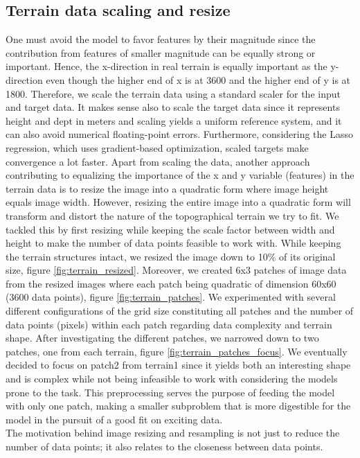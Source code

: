 \documentclass[11pt, a4paper]{article}
\begin{document}
\subsection*{Terrain data scaling and resize}
One must avoid the model to favor features by their magnitude since the contribution from features of smaller magnitude can be equally strong or important. 
Hence, the x-direction in real terrain is equally important as the y-direction even though the higher end of x is at 3600 and the higher end of y is at 1800. 
Therefore, we scale the terrain data using a standard scaler for the input and target data. It makes sense also to scale the target data since it represents 
height and dept in meters and scaling yields a uniform reference system, and it can also avoid numerical floating-point errors. Furthermore, considering the Lasso regression,
which uses gradient-based optimization, scaled targets make convergence a lot faster.  
Apart from scaling the data, another approach contributing to equalizing the importance of the x and y variable (features) in the terrain data is to resize the image into a
quadratic form where image height equals image width. However, resizing the entire image into a quadratic form will transform and distort the nature of the topographical 
terrain we try to fit. We tackled this by first resizing while keeping the scale factor between width and height to make the number of data points feasible to work with.
While keeping the terrain structures intact, we resized the image down to 10\% of its original size, figure \ref{fig:terrain_resized}. Moreover, we created 6x3 patches of
image data from the resized images where each patch being quadratic of dimension 60x60 (3600 data points), figure \ref{fig:terrain_patches}. We experimented with several 
different configurations of the grid size constituting all patches and the number of data points (pixels) within each patch regarding data complexity and terrain shape.
After investigating the different patches, we narrowed down to two patches, one from each terrain, figure \ref{fig:terrain_patches_focus}. We eventually decided to focus 
on patch2 from terrain1 since it yields both an interesting shape and is complex while not being infeasible to work with considering the models prone to the task. 
This preprocessing serves the purpose of feeding the model with only one patch, making a smaller subproblem that is more digestible for the model in the pursuit of a good 
fit on exciting data.\\
The motivation behind image resizing and resampling is not just to reduce the number of data points; it also relates to the closeness between data points. 
\end{document}
